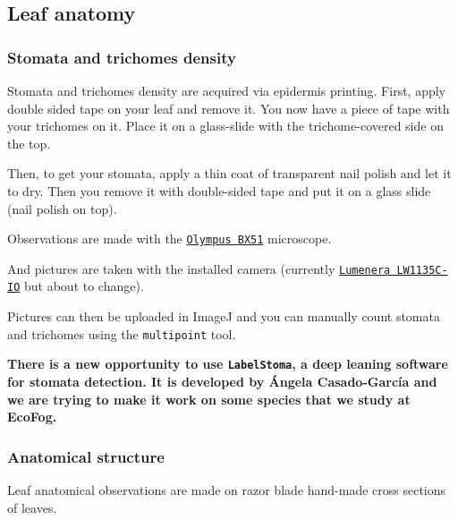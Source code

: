 \documentclass[
  12pt,
  american,
  a4paper,
  extrafontsizes,onecolumn,openright
  ]{memoir}
\begin{document}
\normalsize

\hypertarget{leaf-anatomy}{%
\subsection{Leaf anatomy}\label{leaf-anatomy}}

\hypertarget{stomata-and-trichomes-density}{%
\subsubsection{Stomata and trichomes density}\label{stomata-and-trichomes-density}}

Stomata and trichomes density are acquired via epidermis printing.
First, apply double sided tape on your leaf and remove it.
You now have a piece of tape with your trichomes on it.
Place it on a glass-slide with the trichome-covered side on the top.

Then, to get your stomata, apply a thin coat of transparent nail polish and let it to dry.
Then you remove it with double-sided tape and put it on a glass slide (nail polish on top).

Observations are made with the \href{document/machine/Olympus\%20BX51/olympus_bx-51_bx52_microscope_manual.pdf}{\texttt{Olympus\ BX51}} microscope.

And pictures are taken with the installed camera (currently \href{document/machine/Lumenera\%20LW1135C-IO/Lumenera-USB-GigE-Camera-User-Manual.pdf}{\texttt{Lumenera\ LW1135C-IO}} but about to change).

Pictures can then be uploaded in ImageJ and you can manually count stomata and trichomes using the \texttt{multipoint} tool.

\textbf{There is a new opportunity to use \texttt{LabelStoma}, a deep leaning software for stomata detection.
It is developed by Ángela Casado-García and we are trying to make it work on some species that we study at EcoFog.}

\hypertarget{anatomical-structure}{%
\subsubsection{Anatomical structure}\label{anatomical-structure}}

Leaf anatomical observations are made on razor blade hand-made cross sections of leaves.

\scriptsize
\end{document}
